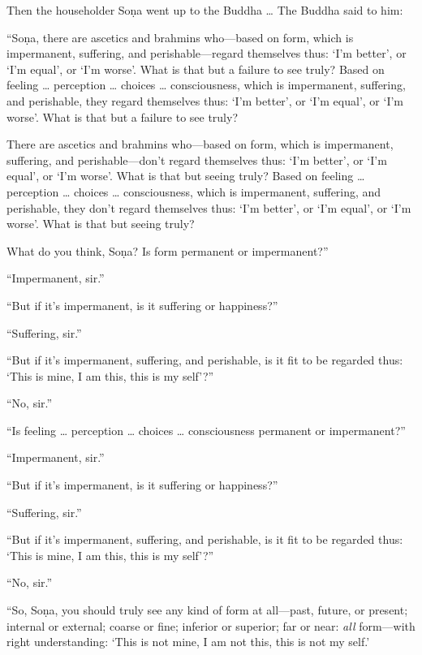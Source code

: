 \documentclass[12pt,openany]{book}%
\begin{document}
Then the householder \textsanskrit{Soṇa} went up to the Buddha … The Buddha said to him: 

“\textsanskrit{Soṇa}, there are ascetics and brahmins who—based on form, which is impermanent, suffering, and perishable—regard themselves thus: ‘I’m better’, or ‘I’m equal’, or ‘I’m worse’. What is that but a failure to see truly? Based on feeling … perception … choices … consciousness, which is impermanent, suffering, and perishable, they regard themselves thus: ‘I’m better’, or ‘I’m equal’, or ‘I’m worse’. What is that but a failure to see truly? 

There are ascetics and brahmins who—based on form, which is impermanent, suffering, and perishable—don’t regard themselves thus: ‘I’m better’, or ‘I’m equal’, or ‘I’m worse’. What is that but seeing truly? Based on feeling … perception … choices … consciousness, which is impermanent, suffering, and perishable, they don’t regard themselves thus: ‘I’m better’, or ‘I’m equal’, or ‘I’m worse’. What is that but seeing truly? 

What do you think, \textsanskrit{Soṇa}? Is form permanent or impermanent?” 

“Impermanent, sir.” 

“But if it’s impermanent, is it suffering or happiness?” 

“Suffering, sir.” 

“But if it’s impermanent, suffering, and perishable, is it fit to be regarded thus: ‘This is mine, I am this, this is my self’?” 

“No, sir.” 

“Is feeling … perception … choices … consciousness permanent or impermanent?” 

“Impermanent, sir.” 

“But if it’s impermanent, is it suffering or happiness?” 

“Suffering, sir.” 

“But if it’s impermanent, suffering, and perishable, is it fit to be regarded thus: ‘This is mine, I am this, this is my self’?” 

“No, sir.” 

“So, \textsanskrit{Soṇa}, you should truly see any kind of form at all—past, future, or present; internal or external; coarse or fine; inferior or superior; far or near: \emph{all} form—with right understanding: ‘This is not mine, I am not this, this is not my self.’ 
\end{document}
